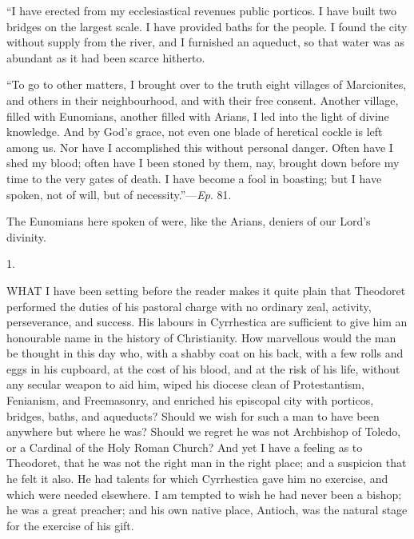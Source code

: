 ``I have erected from my ecclesiastical revenues public
porticos. I have built two bridges on the largest scale. I have
provided baths for the people. I found the city without supply from
the river, and I furnished an aqueduct, so that water was as abundant
as it had been scarce hitherto.

``To go to other matters, I brought over to the truth eight
villages of Marcionites, and others in their neighbourhood, and with
their free consent. Another village, filled with Eunomians, another
filled with Arians, I led into the light of divine knowledge. And by
God's grace, not even one blade of heretical cockle is left among us.
Nor have I accomplished this without personal danger. Often have I
shed my blood; often have I been stoned by them, nay, brought down
before my time to the very gates of death. I have become a fool in
boasting; but I have spoken, not of will, but of necessity.''—\emph{Ep}.
81.

The Eunomians here spoken of were, like the Arians, deniers of our
Lord's divinity.


1.

WHAT I have been setting before the reader
makes it quite plain that Theodoret performed the duties of his
pastoral charge with no ordinary zeal, activity, perseverance, and
success. His labours in Cyrrhestica are sufficient to give him an
honourable name in the history of Christianity. How marvellous would
the man be thought in this day who, with a shabby coat on his back,
with a few rolls and eggs in his cupboard, at the cost of his blood,
and at the risk of his life, without any secular weapon to aid him,
wiped his diocese clean of Protestantism, Fenianism, and Freemasonry,
and enriched his episcopal city with porticos, bridges, baths, and
aqueducts? Should we wish for such a man to have been anywhere but
where he was? Should we regret he was not Archbishop of Toledo, or a
Cardinal of the Holy Roman Church? And yet I have a feeling as to
Theodoret, that he was not the right man in the right place; and a
suspicion that he felt it also. He had talents for which Cyrrhestica
gave him no exercise, and which were needed elsewhere. I am tempted to
wish he had never been a bishop; he was a great preacher; and his own
native place, Antioch, was the natural stage for the exercise of his
gift.

